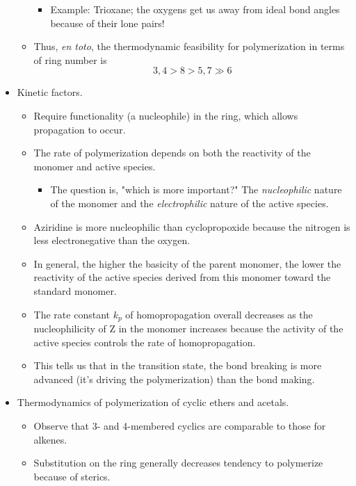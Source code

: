 \documentclass[../notes.tex]{subfiles}
\begin{document}
\begin{itemize}
\begin{itemize}
\begin{itemize}
            \item Example: Trioxane; the oxygens get us away from ideal bond angles because of their lone pairs!
        \end{itemize}
        \item Thus, \emph{en toto}, the thermodynamic feasibility for polymerization in terms of ring number is
        \begin{equation*}
            3,4 > 8 > 5,7 \gg 6
        \end{equation*}
    \end{itemize}
    \item Kinetic factors.
    \begin{itemize}
        \item Require functionality (a nucleophile) in the ring, which allows propagation to occur.
        \item The rate of polymerization depends on both the reactivity of the monomer and active species.
        \begin{itemize}
            \item The question is, "which is more important?" The \emph{nucleophilic} nature of the monomer and the \emph{electrophilic} nature of the active species.
        \end{itemize}
        \item Aziridine is more nucleophilic than cyclopropoxide because the nitrogen is less electronegative than the oxygen.
        \item In general, the higher the basicity of the parent monomer, the lower the reactivity of the active species derived from this monomer toward the standard monomer.
        \item The rate constant $k_p$ of homopropagation overall decreases as the nucleophilicity of Z in the monomer increases because the activity of the active species controls the rate of homopropagation.
        \item This tells us that in the transition state, the bond breaking is more advanced (it's driving the polymerization) than the bond making.
    \end{itemize}
    \item Thermodynamics of polymerization of cyclic ethers and acetals.
    \begin{itemize}
        \item Observe that 3- and 4-membered cyclics are comparable to those for alkenes.
        \item Substitution on the ring generally decreases tendency to polymerize because of sterics.

\end{itemize}
\end{itemize}
\end{document}
